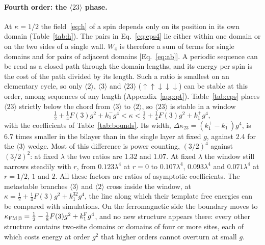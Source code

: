 \documentclass[
 aps,prb,
 twocolumn,
 superscriptaddress,
 longbibliography,
 nofootinbib,
 floatfix
]{revtex4-2}
\newcommand{\up}{\uparrow}
\newcommand{\dn}{\downarrow}
\begin{document}
\paragraph*{Fourth order: the $\langle23\rangle$ phase.}
At $\kappa=1/2$ the field~\eqref{eq:h} of a spin depends only on its position in its own domain
(Table~\ref{tab:h}). The pairs in Eq.~\eqref{eq:eps4} lie either within one domain or on the two sides of a
single wall. $W_4$ is therefore a sum of terms for single domains and for pairs of adjacent domains
[Eq.~\eqref{eq:ab}]. A periodic sequence can be read as a closed path through the domain lengths, and its
energy per spin is the cost of the path divided by its length. Such a ratio is smallest on an elementary
cycle, so only $\langle2\rangle$, $\langle3\rangle$ and $\langle23\rangle$ ($\up\up\dn\dn\dn$) can be stable at this
order, among sequences of any length (Appendix~\ref{app:pt}). Table~\ref{tab:eps} places $\langle23\rangle$
strictly below the chord from $\langle3\rangle$ to $\langle2\rangle$, so $\langle23\rangle$ is stable in a window
\begin{equation}
\tfrac12+\tfrac14F(3)g^2+k_1^-g^4<\kappa<\tfrac12+\tfrac14F(3)g^2+k_1^+g^4,
\label{eq:w23}
\end{equation}
with the coefficients of Table~\ref{tab:bounds}.
Its width, $\Delta\kappa_{23}=(k_1^+-k_1^-)g^4$, is 6.7 times smaller in the bilayer than in the single layer at
fixed $g$, against 2.4 for the $\langle3\rangle$ wedge. Most of this difference is power counting, $(3/2)^4$ against
$(3/2)^2$: at fixed $\lambda$ the two ratios are $1.32$ and $1.07$. At fixed $\lambda$ the window still narrows steadily
with $r$, from $0.123\lambda^4$ at $r=0$ to $0.107\lambda^4$, $0.093\lambda^4$ and $0.071\lambda^4$ at $r=1/2$, $1$ and
$2$. All these factors are ratios of asymptotic coefficients.
The metastable branches $\langle3\rangle$ and $\langle2\rangle$ cross inside the window, at
$\kappa=\tfrac12+\tfrac14F(3)g^2+k_1^{32}g^4$, the line along which their template free energies can be compared with
simulations. On the ferromagnetic side the boundary moves to $\kappa_{\rm FM|3}=\tfrac12-\tfrac18F(3)g^2+k_1^{\rm F}g^4$,
and no new structure appears there: every other structure contains two-site domains or domains of four or more sites,
each of which costs energy at order $g^2$ that higher orders cannot overturn at small $g$.
\end{document}
